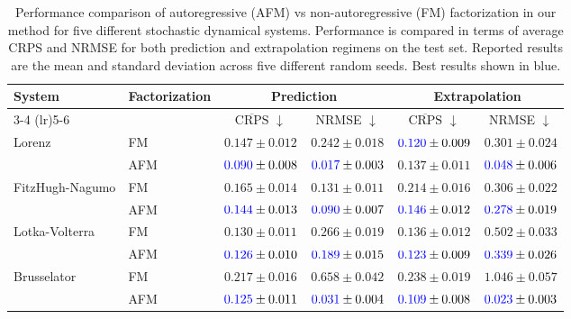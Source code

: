 \documentclass[a4paper,10pt,twocolumn,preprint,3p]{elsarticle}
\begin{document}
\begin{table}[ht]
    \centering
    \caption{Performance comparison of autoregressive (AFM) vs non-autoregressive (FM) factorization in our method for five different stochastic dynamical systems. Performance is compared in terms of average CRPS and NRMSE for both prediction and extrapolation regimens on the test set.
    Reported results are the mean and standard deviation across five different random seeds. Best results shown in blue.}
    \renewcommand{\arraystretch}{1.2}
    \setlength{\tabcolsep}{6pt}
    \begin{small}
    \begin{tabular}{l l cc cc}
        \toprule
        \multirow{2}{*}{\textbf{System}} & \multirow{2}{*}{\textbf{Factorization}} & 
        \multicolumn{2}{c}{\textbf{Prediction}} & \multicolumn{2}{c}{\textbf{Extrapolation}} \\
        \cmidrule(lr){3-4} \cmidrule(lr){5-6}
        & & $\overline{\text{CRPS}}$ \(\downarrow\) & NRMSE \(\downarrow\) & $\overline{\text{CRPS}}$ \(\downarrow\) & NRMSE \(\downarrow\) \\
        \midrule
        \multirow{2}{*}{Lorenz} 
            & FM   & $0.147 \pm 0.012$ & $0.242 \pm 0.018$ & $\textcolor{blue}{0.120} \pm 0.009$ & $0.301 \pm 0.024$ \\
            & AFM & $\textcolor{blue}{0.090} \pm 0.008$ & $\textcolor{blue}{0.017} \pm 0.003$ & $0.137 \pm 0.011$ & $\textcolor{blue}{0.048} \pm 0.006$ \\
        \midrule
        \multirow{2}{*}{FitzHugh-Nagumo} 
            & FM  & $0.165 \pm 0.014$ & $0.131 \pm 0.011$ &  $0.214 \pm 0.016$ & $0.306 \pm 0.022$ \\
            & AFM & $\textcolor{blue}{0.144} \pm 0.013$ & $\textcolor{blue}{0.090} \pm 0.007$ & $\textcolor{blue}{0.146} \pm 0.012$ & $\textcolor{blue}{0.278} \pm 0.019$ \\
        \midrule
        \multirow{2}{*}{Lotka-Volterra} 
            & FM  & $0.130 \pm 0.011$ & $0.266 \pm 0.019$ & $0.136 \pm 0.012$ & $0.502 \pm 0.033$ \\
            & AFM & $\textcolor{blue}{0.126} \pm 0.010$ & $\textcolor{blue}{0.189} \pm 0.015$ & $\textcolor{blue}{0.123} \pm 0.009$ & $\textcolor{blue}{0.339} \pm 0.026$ \\
        \midrule
        \multirow{2}{*}{Brusselator} 
            & FM  & $0.217 \pm 0.016$ & $0.658 \pm 0.042$ & $0.238 \pm 0.019$ & $1.046 \pm 0.057$ \\
            & AFM & $\textcolor{blue}{0.125} \pm 0.011$ & $\textcolor{blue}{0.031} \pm 0.004$ & $\textcolor{blue}{0.109} \pm 0.008$ & $\textcolor{blue}{0.023} \pm 0.003$ \\

\end{tabular}
\end{small}
\end{table}
\end{document}
